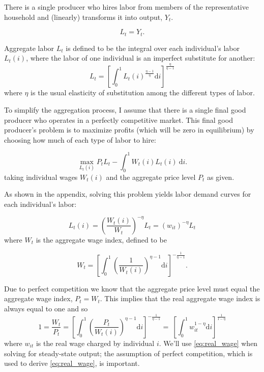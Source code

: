 \documentclass[12pt,a4paper]{scrartcl}            %
\begin{document}
There is a single producer who hires labor from members of the representative household and (linearly) transforms it into output, $Y_t$.

\begin{equation} \label{eq:agg_output}
    L_t = Y_t.
\end{equation}

Aggregate labor \(L_t\) is defined to be the integral over each individual's labor \(L_t(i)\), where the labor of one individual is an imperfect substitute for another:
%
\begin{equation} \label{eq:agg_labor}
    L_t = \left[ \int_0^1 L_t(i)^{\frac{\eta - 1}{\eta}} \mathrm{d}i \right]^{\frac{\eta}{\eta - 1}}
\end{equation}
%
where $\eta$ is the usual elasticity of substitution among the different types of labor.

To simplify the aggregation process, I assume that there is a single final good producer who operates in a perfectly competitive market.
This final good producer's problem is to maximize profits (which will be zero in equilibrium) by choosing how much of each type of labor to hire:

\begin{equation} \label{eq:firms_problem}
    \max_{L_t(i)} P_t L_t - \int_0^1 W_t(i)L_t(i) \ \mathrm{d}i.
\end{equation}
%
taking individual wages $W_t(i)$ and the aggregate price level $P_t$ as given.

As shown in the appendix, solving this problem yields labor demand curves for each individual's labor:

\begin{equation}
    \label{eq:labor_demand}
    L_t(i) = \left( \frac{W_t(i)}{W_t} \right)^{-\eta}L_t = (w_{it})^{-\eta}L_t
\end{equation}
%
where $W_t$ is the aggregate wage index, defined to be

\begin{equation} \label{eq:wage_index}
    W_t = \left[\int_{0}^{1}\left(\frac{1}{W_t(i)}\right)^{\eta - 1} \mathrm{d}i \right]^{-\frac{1}{\eta - 1}}.
\end{equation}

Due to perfect competition we know that the aggregate price level must equal the aggregate wage index, $P_t = W_t$.  This implies that the real aggregate wage index is always equal to one and so
%
\begin{equation} \label{eq:real_wage}
    1 = \frac{W_t}{P_t} = \left[\int_{0}^{1} \left( \frac{P_t}{W_t(i)} \right)^{\eta - 1} \mathrm{d}i \right]^{-\frac{1}{\eta - 1} }\!\!\!\! = \ \left[\int_{0}^{1} \! w_{it}^{1 - \eta} \mathrm{d}i \right]^{ \frac{1}{1 - \eta} }
\end{equation}
%
where $w_{it}$ is the real wage charged by individual $i$.
We'll use \eqref{eq:real_wage} when solving for steady-state output;  the assumption of perfect competition, which is used to derive \eqref{eq:real_wage}, is important.
\end{document}
